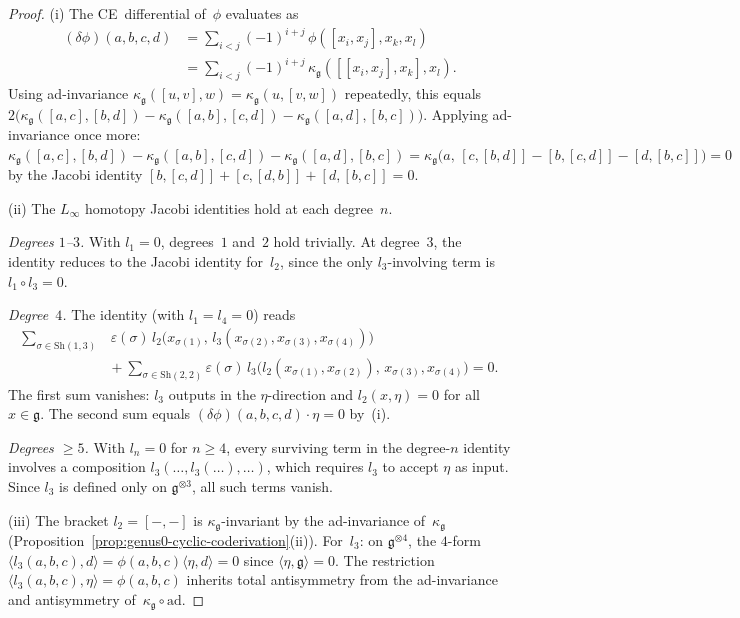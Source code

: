 \begin{proof}
(i)\enspace
The CE~differential of~$\phi$ evaluates as
\begin{align*}
(\delta\phi)(a,b,c,d)
&= \textstyle\sum_{i<j}(-1)^{i+j}\,
 \phi([x_i,x_j],x_k,x_l) \\
&= \textstyle\sum_{i<j}(-1)^{i+j}\,
 \kappa_{\mathfrak{g}}([[x_i,x_j],x_k],x_l).
\end{align*}
Using ad-invariance $\kappa_{\mathfrak{g}}([u,v],w) = \kappa_{\mathfrak{g}}(u,[v,w])$
repeatedly, this equals
$2\bigl(\kappa_{\mathfrak{g}}([a,c],[b,d]) - \kappa_{\mathfrak{g}}([a,b],[c,d])
 - \kappa_{\mathfrak{g}}([a,d],[b,c])\bigr)$.
Applying ad-invariance once more:
$\kappa_{\mathfrak{g}}([a,c],[b,d]) - \kappa_{\mathfrak{g}}([a,b],[c,d])
 - \kappa_{\mathfrak{g}}([a,d],[b,c])
= \kappa_{\mathfrak{g}}\bigl(a,\,
 [c,[b,d]] - [b,[c,d]] - [d,[b,c]]\bigr) = 0$
by the Jacobi identity $[b,[c,d]] + [c,[d,b]] + [d,[b,c]] = 0$.

(ii)\enspace
The $L_\infty$ homotopy Jacobi identities hold at
each degree~$n$.

\emph{Degrees $1$--$3$.}
With $l_1 = 0$, degrees~$1$ and~$2$ hold trivially.
At degree~$3$, the identity reduces to the Jacobi identity
for~$l_2$, since the only $l_3$-involving term is
$l_1\circ l_3 = 0$.

\emph{Degree~$4$.}
The identity (with $l_1 = l_4 = 0$) reads
\begin{equation}\label{eq:degree4-linf}
\begin{split}
\textstyle\sum_{\sigma \in \mathrm{Sh}(1,3)}
 &\,\varepsilon(\sigma)\,l_2\bigl(x_{\sigma(1)},\,
 l_3(x_{\sigma(2)},x_{\sigma(3)},x_{\sigma(4)})\bigr)\\
&{}+ \textstyle\sum_{\sigma \in \mathrm{Sh}(2,2)}
 \varepsilon(\sigma)\,l_3\bigl(l_2(x_{\sigma(1)},
 x_{\sigma(2)}),\,x_{\sigma(3)},x_{\sigma(4)}\bigr) = 0.
\end{split}
\end{equation}
The first sum vanishes: $l_3$ outputs in the
$\eta$-direction and $l_2(x,\eta) = 0$ for all
$x \in \mathfrak{g}$. The second sum equals
$(\delta\phi)(a,b,c,d)\cdot\eta = 0$ by~(i).

\emph{Degrees $\geq 5$.}
With $l_n = 0$ for $n \geq 4$, every surviving term in the
degree-$n$ identity involves a composition
$l_3(\dots, l_3(\dots), \dots)$, which requires $l_3$ to
accept $\eta$ as input. Since $l_3$ is defined only on
$\mathfrak{g}^{\otimes 3}$, all such terms vanish.

(iii)\enspace
The bracket $l_2 = [-,-]$ is $\kappa_{\mathfrak{g}}$-invariant by the
ad-invariance of~$\kappa_{\mathfrak{g}}$
(Proposition~\ref{prop:genus0-cyclic-coderivation}(ii)).
For~$l_3$: on $\mathfrak{g}^{\otimes 4}$, the $4$-form
$\langle l_3(a,b,c),d\rangle = \phi(a,b,c)\langle\eta,d\rangle
= 0$ since $\langle\eta,\mathfrak{g}\rangle = 0$.
The restriction
$\langle l_3(a,b,c),\eta\rangle = \phi(a,b,c)$ inherits total
antisymmetry from the ad-invariance and antisymmetry
of~$\kappa_{\mathfrak{g}}\circ\mathrm{ad}$.
\end{proof}

